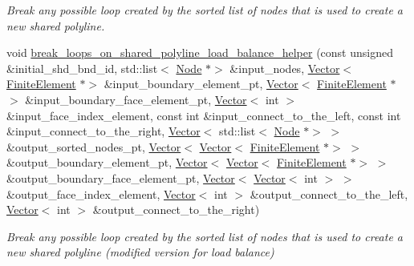 \begin{DoxyCompactItemize}
\begin{DoxyCompactList}\small\item\em Break any possible loop created by the sorted list of nodes that is used to create a new shared polyline. \end{DoxyCompactList}\item 
void \hyperlink{classoomph_1_1TriangleMesh_a7a11910db7d631b7949d2342e2573304}{break\+\_\+loops\+\_\+on\+\_\+shared\+\_\+polyline\+\_\+load\+\_\+balance\+\_\+helper} (const unsigned \&initial\+\_\+shd\+\_\+bnd\+\_\+id, std\+::list$<$ \hyperlink{classoomph_1_1Node}{Node} $\ast$$>$ \&input\+\_\+nodes, \hyperlink{classoomph_1_1Vector}{Vector}$<$ \hyperlink{classoomph_1_1FiniteElement}{Finite\+Element} $\ast$$>$ \&input\+\_\+boundary\+\_\+element\+\_\+pt, \hyperlink{classoomph_1_1Vector}{Vector}$<$ \hyperlink{classoomph_1_1FiniteElement}{Finite\+Element} $\ast$$>$ \&input\+\_\+boundary\+\_\+face\+\_\+element\+\_\+pt, \hyperlink{classoomph_1_1Vector}{Vector}$<$ int $>$ \&input\+\_\+face\+\_\+index\+\_\+element, const int \&input\+\_\+connect\+\_\+to\+\_\+the\+\_\+left, const int \&input\+\_\+connect\+\_\+to\+\_\+the\+\_\+right, \hyperlink{classoomph_1_1Vector}{Vector}$<$ std\+::list$<$ \hyperlink{classoomph_1_1Node}{Node} $\ast$$>$ $>$ \&output\+\_\+sorted\+\_\+nodes\+\_\+pt, \hyperlink{classoomph_1_1Vector}{Vector}$<$ \hyperlink{classoomph_1_1Vector}{Vector}$<$ \hyperlink{classoomph_1_1FiniteElement}{Finite\+Element} $\ast$$>$ $>$ \&output\+\_\+boundary\+\_\+element\+\_\+pt, \hyperlink{classoomph_1_1Vector}{Vector}$<$ \hyperlink{classoomph_1_1Vector}{Vector}$<$ \hyperlink{classoomph_1_1FiniteElement}{Finite\+Element} $\ast$$>$ $>$ \&output\+\_\+boundary\+\_\+face\+\_\+element\+\_\+pt, \hyperlink{classoomph_1_1Vector}{Vector}$<$ \hyperlink{classoomph_1_1Vector}{Vector}$<$ int $>$ $>$ \&output\+\_\+face\+\_\+index\+\_\+element, \hyperlink{classoomph_1_1Vector}{Vector}$<$ int $>$ \&output\+\_\+connect\+\_\+to\+\_\+the\+\_\+left, \hyperlink{classoomph_1_1Vector}{Vector}$<$ int $>$ \&output\+\_\+connect\+\_\+to\+\_\+the\+\_\+right)
\begin{DoxyCompactList}\small\item\em Break any possible loop created by the sorted list of nodes that is used to create a new shared polyline (modified version for load balance) \end{DoxyCompactList}\item 

\end{DoxyCompactItemize}
